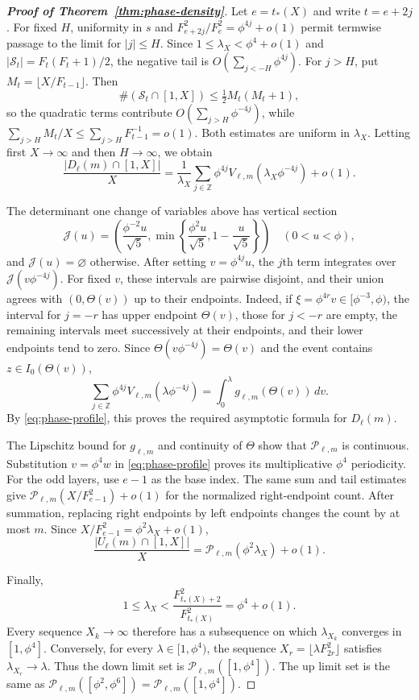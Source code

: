 \documentclass[11pt]{amsart}
\theoremstyle{definition}
\newcommand{\Scal}{\mathcal S}
\begin{document}
\begin{proof}[\bf Proof of Theorem~\ref{thm:phase-density}]
Let $e=t_*(X)$ and write $t=e+2j$. For fixed $H$, uniformity in $s$ and
$F_{e+2j}^2/F_e^2=\phi^{4j}+o(1)$ permit termwise passage to the limit
for $|j|\leq H$. Since $1\leq\lambda_X<\phi^4+o(1)$ and
$|\Scal_t|=F_t(F_t+1)/2$, the negative tail is
$O(\sum_{j<-H}\phi^{4j})$. For $j>H$, put
$M_t=\lfloor X/F_{t-1}\rfloor$. Then
\[
 \#(\Scal_t\cap[1,X])\leq\tfrac12M_t(M_t+1),
\]
so the quadratic terms contribute $O(\sum_{j>H}\phi^{-4j})$, while
$\sum_{j>H}M_t/X\leq\sum_{j>H}F_{t-1}^{-1}=o(1)$. Both estimates are
uniform in $\lambda_X$. Letting first $X\to\infty$ and then
$H\to\infty$, we obtain
\[
 \frac{|D_\ell(m)\cap[1,X]|}{X}
 =\frac1{\lambda_X}\sum_{j\in\mathbb Z}
 \phi^{4j}V_{\ell,m}(\lambda_X\phi^{-4j})+o(1).
\]

The determinant one change of variables above has vertical section
\[
 \mathcal J(u)=\left(\frac{\phi^{-2}u}{\sqrt5},
 \min\left\{\frac{\phi^2u}{\sqrt5},1-\frac u{\sqrt5}\right\}\right)
 \quad(0<u<\phi),
\]
and $\mathcal J(u)=\varnothing$ otherwise. After setting
$v=\phi^{4j}u$, the $j$th term integrates over
$\mathcal J(v\phi^{-4j})$. For fixed $v$, these intervals are pairwise disjoint, and their union
agrees with $(0,\Theta(v))$ up to their endpoints. Indeed, if
$\xi=\phi^{4r}v\in[\phi^{-3},\phi)$, the interval for $j=-r$ has upper
endpoint $\Theta(v)$, those for $j<-r$ are empty, the remaining
intervals meet successively at their endpoints, and their lower
endpoints tend to zero. Since $\Theta(v\phi^{-4j})=\Theta(v)$ and the
event contains $z\in I_0(\Theta(v))$,
\[
 \sum_{j\in\mathbb Z}\phi^{4j}V_{\ell,m}(\lambda\phi^{-4j})
 =\int_0^\lambda g_{\ell,m}(\Theta(v))\,dv.
\]
By \eqref{eq:phase-profile}, this proves the required asymptotic formula
for $D_\ell(m)$.

The Lipschitz bound for $g_{\ell,m}$ and continuity of $\Theta$ show
that $\mathcal P_{\ell,m}$ is continuous. Substitution $v=\phi^4w$ in
\eqref{eq:phase-profile} proves its multiplicative $\phi^4$ periodicity.
For the odd layers, use $e-1$ as the base index. The same sum and tail
estimates give $\mathcal P_{\ell,m}(X/F_{e-1}^2)+o(1)$ for the
normalized right-endpoint count. After summation, replacing right
endpoints by left endpoints changes the count by at most $m$. Since
$X/F_{e-1}^2=\phi^2\lambda_X+o(1)$,
\[
 \frac{|U_\ell(m)\cap[1,X]|}{X}
 =\mathcal P_{\ell,m}(\phi^2\lambda_X)+o(1).
\]

Finally,
\[
 1\leq\lambda_X<
 \frac{F_{t_*(X)+2}^2}{F_{t_*(X)}^2}=\phi^4+o(1).
\]
Every sequence $X_k\to\infty$ therefore has a subsequence on which
$\lambda_{X_k}$ converges in $[1,\phi^4]$. Conversely, for every
$\lambda\in[1,\phi^4)$, the sequence
$X_r=\lfloor\lambda F_{2r}^2\rfloor$ satisfies
$\lambda_{X_r}\to\lambda$. Thus the down limit set is
$\mathcal P_{\ell,m}([1,\phi^4])$. The up limit set is the same as
$\mathcal P_{\ell,m}([\phi^2,\phi^6])
=\mathcal P_{\ell,m}([1,\phi^4])$.
\end{proof}
\end{document}
